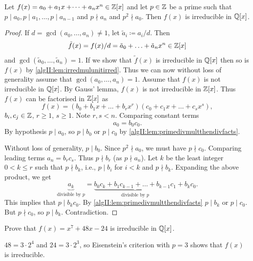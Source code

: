 \documentclass[10pt, a4paper]{article}
\begin{document}
\begin{proposition}
    Let $f(x) = a_0 + a_1x + \dotsi + a_nx ^ n \in \mathbb{Z}[x]$ and let $p \in \mathbb{Z}$ be a prime such that $p \mid a_0, p \mid a_1, \dotsc, p \mid a_{n - 1}$ and $p \nmid a_n$ and $p ^ 2 \nmid a_0$.
    Then $f(x)$ is irreducible in $\mathbb{Q}[x]$.

    \begin{proof}
        If $d = \gcd(a_0, \dotsc, a_n) \neq 1$,
        let $\tilde{a}_i \coloneqq a_i / d$.
        Then
        \[
        \tilde{f}(x) = f(x) / d = \tilde{a}_0 + \dotsc + \tilde{a}_nx ^ n \in \mathbb{Z}[x]
        \]
        and $\gcd(\tilde{a}_0, \dotsc, \tilde{a}_n) = 1$.
        If we show that $\tilde{f}(x)$ is irreducible in $\mathbb{Q}[x]$ then so is $f(x)$ by \autoref{algII:lem:irredmulunitirred}.
        Thus we can now without loss of generality assume that $\gcd(a_0, \dotsc, a_n) = 1$.
        Assume that $f(x)$ is not irreducible in $\mathbb{Q}[x]$.
        By Gauss' lemma,
        $f(x)$ is not irreducible in $\mathbb{Z}[x]$.
        Thus $f(x)$ can be factorised in $\mathbb{Z}[x]$ as
        \[
        f(x) = (b_0 + b_1x + \dotsc + b_rx ^ r)(c_0 + c_1x + \dotsc + c_sx ^ s),
        \]
        $b_i, c_j \in \mathbb{Z}$,
        $r \geq 1$,
        $s \geq 1$.
        Note $r, s < n$.
        Comparing constant terms
        \[
        a_0 = b_0c_0.
        \]
        By hypothesis $p \mid a_0$,
        so $p \mid b_0$ or $p \mid c_0$ by \autoref{algII:lem:primedivmultthendivfacts}.

        Without loss of generality,
        $p \mid b_0$.
        Since $p ^ 2 \nmid a_0$,
        we must have $p \nmid c_0$.
        Comparing leading terms $a_n = b_rc_s$.
        Thus $p \nmid b_r$
        (as $p \nmid a_n$).
        Let $k$ be the least integer $0 < k \leq r$ such that $p \nmid b_k$,
        i.e.,
        $p \mid b_i$ for $i < k$ and $p \nmid b_k$.
        Expanding the above product,
        we get
        \[
        \underbrace{a_k}_{\text{divisible by $p$}} = \underbrace{b_0c_k + b_1c_{k - 1} + \dotsc + b_{k - 1}c_1}_{\text{divisible by $p$}} + b_kc_0.
        \]
        This implies that $p \mid b_kc_0$.
        By \autoref{algII:lem:primedivmultthendivfacts} $p \mid b_k$ or $p \mid c_0$.
        But $p \nmid c_0$,
        so $p \mid b_k$.
        Contradiction.
    \end{proof}
\end{proposition}

\begin{example}
    Prove that $f(x) = x ^ 7 + 48x - 24$ is irreducible in $\mathbb{Q}[x]$.

    \begin{solution}
        $48 = 3 \cdot 2 ^ 4$ and $24 = 3 \cdot 2 ^ 3$,
        so Eisenstein's criterion with $p = 3$ shows that $f(x)$ is irreducible.
    \end{solution}
\end{example}
\end{document}
